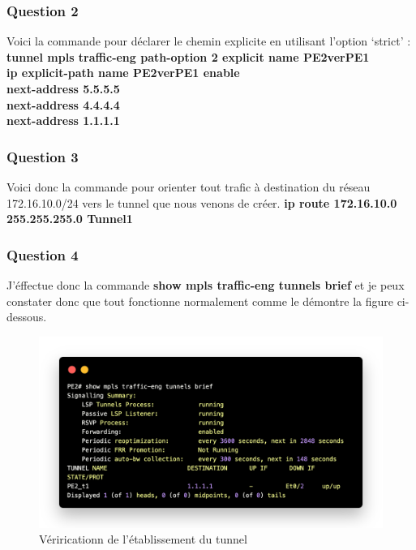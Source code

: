 \documentclass[12pt, a4paper]{article}
\begin{document}
\newpage
\subsubsection{Question 2}
Voici la commande pour déclarer le chemin explicite en utilisant l’option ‘strict’ :\\
\textbf{tunnel mpls traffic-eng path-option 2 explicit name PE2verPE1\\}
\textbf{ip explicit-path name PE2verPE1 enable\\
next-address 5.5.5.5\\
next-address 4.4.4.4\\
next-address 1.1.1.1\\}

\subsubsection{Question 3}
Voici donc la commande pour orienter tout trafic à destination du réseau 172.16.10.0/24 vers le tunnel que nous
venons de créer.
\textbf{ip route 172.16.10.0 255.255.255.0 Tunnel1}

\subsubsection{Question 4}
J'éffectue donc la commande \textbf{show mpls traffic-eng tunnels brief}
et je peux constater donc que tout fonctionne normalement comme le démontre
la figure ci-dessous.
\begin{figure}[h]
    \centering
    \includegraphics[width=1\textwidth]{img/code12.png}
    \caption{Vériricationn de l'établissement du tunnel}
    \label{fig:script12}
\end{figure}
\end{document}
